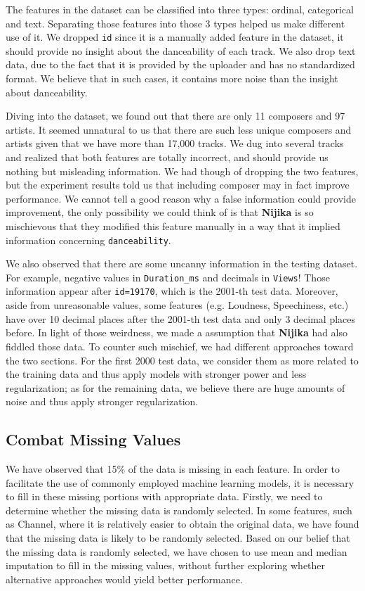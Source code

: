 \documentclass[10pt,letterpaper]{article}
\begin{document}
The features in the dataset can be classified into three types: ordinal, categorical and text. Separating those features into those $3$ types helped us make different use of it. We dropped \texttt{id} since it is a manually added feature in the dataset, it should provide no insight about the danceability of each track. We also drop text data, due to the fact that it is provided by the uploader and has no standardized format. We believe that in such cases, it contains more noise than the insight about danceability. 

Diving into the dataset, we found out that there are only 11 composers and 97 artists. It seemed unnatural to us that there are such less unique composers and artists given that we have more than 17,000 tracks. We dug into several tracks and realized that both features are totally incorrect, and should provide us nothing but misleading information. We had though of dropping the two features, but the experiment results told us that including composer may in fact improve performance. We cannot tell a good reason why a false information could provide improvement, the only possibility we could think of is that \textbf{Nijika} is so mischievous that they modified this feature manually in a way that it implied information concerning \texttt{danceability}.

We also observed that there are some uncanny information in the testing dataset. For example, negative values in \verb|Duration_ms| and decimals in \verb|Views|! Those information appear after \verb|id=19170|, which is the 2001-th test data. Moreover, aside from unreasonable values, some features (e.g. Loudness, Speechiness, etc.) have over 10 decimal places after the 2001-th test data and only 3 decimal places before. In light of those weirdness, we made a assumption that \textbf{Nijika} had also fiddled those data. To counter such mischief, we had different approaches toward the two sections. For the first 2000 test data, we consider them as more related to the training data and thus apply models with stronger power and less regularization; as for the remaining data, we believe there are huge amounts of noise and thus apply stronger regularization. 

\subsection{Combat Missing Values}

We have observed that 15\% of the data is missing in each feature. In order to facilitate the use of commonly employed machine learning models, it is necessary to fill in these missing portions with appropriate data. Firstly, we need to determine whether the missing data is randomly selected. 
In some features, such as Channel, where it is relatively easier to obtain the original data, we have found that the missing data is likely to be randomly selected. Based on our belief that the missing data is randomly selected, we have chosen to use mean and median imputation to fill in the missing values, without further exploring whether alternative approaches would yield better performance.
\end{document}
